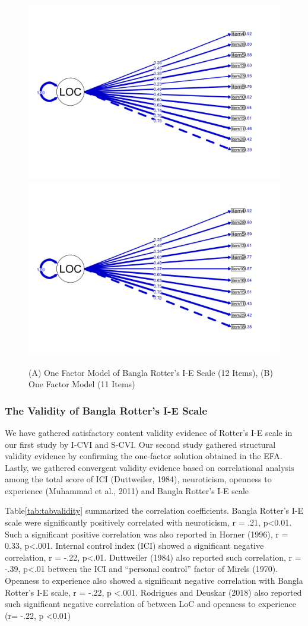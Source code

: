 \documentclass[
  man]{apa6}
\begin{document}
\begin{figure}
\includegraphics[width=0.5\linewidth]{Rotterpaper_files/figure-latex/figcfa-1} \includegraphics[width=0.5\linewidth]{Rotterpaper_files/figure-latex/figcfa-2} \caption{(A) One Factor Model of Bangla Rotter's I-E Scale (12 Items), (B) One Factor Model (11 Items)}\label{fig:figcfa}
\end{figure}

\hypertarget{the-validity-of-bangla-rotters-i-e-scale}{%
\subsubsection{The Validity of Bangla Rotter's I-E Scale}\label{the-validity-of-bangla-rotters-i-e-scale}}

We have gathered satisfactory content validity evidence of Rotter's I-E scale in our first study by I-CVI and S-CVI. Our second study gathered structural validity evidence by confirming the one-factor solution obtained in the EFA. Lastly, we gathered convergent validity evidence based on correlational analysis among the total score of ICI (Duttweiler, 1984), neuroticism, openness to experience (Muhammad et al., 2011) and Bangla Rotter's I-E scale

Table\ref{tab:tabvalidity} summarized the correlation coefficients. Bangla Rotter's I-E scale were significantly positively correlated with neuroticism, r = .21, p\textless0.01. Such a significant positive correlation was also reported in Horner (1996), r = 0.33, p\textless.001. Internal control index (ICI) showed a significant negative correlation, r = -.22, p\textless.01. Duttweiler (1984) also reported such correlation, r = -.39, p\textless.01 between the ICI and ``personal control'' factor of Mirels (1970). Openness to experience also showed a significant negative correlation with Bangla Rotter's I-E scale, r = -.22, p \textless.001. Rodrigues and Deuskar (2018) also reported such significant negative correlation of between LoC and openness to experience (r= -.22, p \textless0.01)
\end{document}

